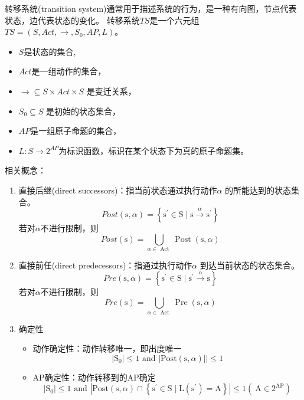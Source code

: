 \begin{definition}
转移系统(transition system)通常用于描述系统的行为，是一种有向图，节点代表状态，边代表状态的变化。
转移系统$TS$是一个六元组$ TS = \left(S,Act,\rightarrow,S_0,AP,L\right)$。
\begin{itemize}
    \item $S$是状态的集合,
    \item $Act$是一组动作的集合，
    \item $\rightarrow \subseteq S \times Act \times S$ 是变迁关系，
    \item $S_0 \subseteq S$ 是初始的状态集合，
    \item $AP$是一组原子命题的集合，
    \item $L: S \rightarrow 2^{AP}$为标识函数，标识在某个状态下为真的原子命题集。
\end{itemize}
相关概念：
\begin{enumerate}
    \item 直接后继(direct successors)：指当前状态通过执行动作$\alpha$ 的所能达到的状态集合。
    $$
    {Post}(\mathrm{s}, \alpha)=\left\{\mathrm{s}^{\prime} \in \mathrm{S} \mid \mathrm{s} \stackrel{\alpha}{\longrightarrow} \mathrm{s}^{\prime}\right\}
    $$
    若对$\alpha$不进行限制，则
    $$
    {Post}(\mathrm{s})=\bigcup_{\alpha \in \text { Act }} \operatorname{Post}(\mathrm{s}, \alpha)
    $$
    \item 直接前任(direct predecessors)：指通过执行动作$\alpha$ 到达当前状态的状态集合。
    $$
    {Pre}(\mathrm{s}, \alpha)=\left\{\mathrm{s}^{\prime} \in \mathrm{S} \mid \mathrm{s}^{\prime} \stackrel{\alpha}{\longrightarrow} \mathrm{s}\right\}
    $$
    若对$\alpha$不进行限制，则
    $$
    {Pre}(\mathrm{s})=\bigcup_{\alpha \in \text { Act }} \operatorname{Pre}(\mathrm{s}, \alpha)
    $$
    \item 确定性
    \begin{itemize}
    \item 动作确定性：动作转移唯一，即出度唯一
    $$
    \left|\mathrm{S}_0\right| \leq 1 \text { and }\left|\mathrm{Post}(\mathrm{s}, \alpha)\right|| \leq 1
    $$
    \item AP确定性：动作转移到的AP确定
    $$
    \left|\mathrm{S}_0\right| \leq 1 \text { and }\left|\mathrm{Post}(\mathrm{s}, \alpha) \cap\left\{\mathrm{s}^{\prime} \in \mathrm{S} \mid \mathrm{L}\left(\mathrm{s}^{\prime}\right)=\mathrm{A}\right\}\right| \leq 1\left(\mathrm{~A} \in 2^{\mathrm{AP}}\right)
    $$
    \end{itemize}
\end{enumerate}
\end{definition}

